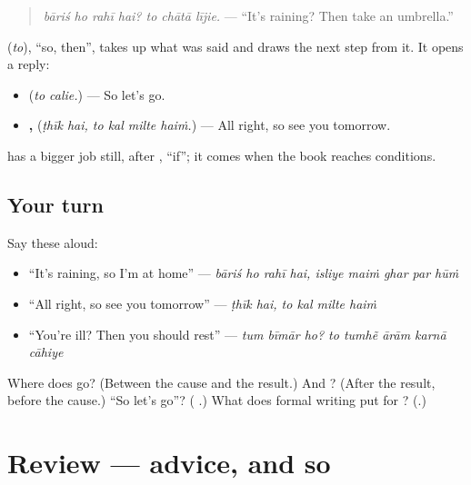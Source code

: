 \begin{quote}
\emph{bāriś ho rahī hai? to chātā lījie.} — \textquotedblleft{}It's raining? Then take an umbrella.\textquotedblright{}
\end{quote}

\textbf{} (\emph{to}), \textquotedblleft{}so, then\textquotedblright{}, takes up what was said and draws the next step from it. It opens a reply:

\begin{itemize}
\raggedright
  \item \textbf{ } (\emph{to calie.}) — So let's go.
  \item \textbf{ ,    } (\emph{ṭhīk hai, to kal milte haiṁ.}) — All right, so see you tomorrow.
\end{itemize}

\textbf{} has a bigger job still, after \textbf{}, \textquotedblleft{}if\textquotedblright{}; it comes when the book reaches conditions.

\subsection*{Your turn}
Say these aloud:

\begin{itemize}
\raggedright
  \item \textquotedblleft{}It's raining, so I'm at home\textquotedblright{} — \emph{bāriś ho rahī hai, isliye maiṁ ghar par hūṁ}
  \item \textquotedblleft{}All right, so see you tomorrow\textquotedblright{} — \emph{ṭhīk hai, to kal milte haiṁ}
  \item \textquotedblleft{}You're ill? Then you should rest\textquotedblright{} — \emph{tum bīmār ho? to tumhẽ ārām karnā cāhiye}
\end{itemize}

\begin{tcolorbox}[breakable,colback=teal!4,colframe=teal!35!black,title={Before you move on}]
Where does \textbf{} go? (Between the cause and the result.) And \textbf{}? (After the result, before the cause.) \textquotedblleft{}So let's go\textquotedblright{}? (\textbf{ }.) What does formal writing put for \textbf{}? (\textbf{}.)
\end{tcolorbox}
\section[(review)]{Review — advice, and so}

